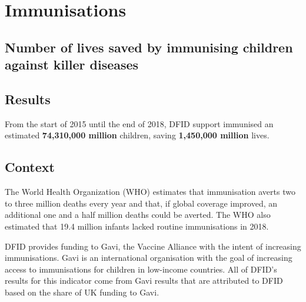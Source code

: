 \chapter{Immunisations}

\section*{Number of lives saved by immunising children against killer diseases}


\thispagestyle{empty}



\section{Results}
From the start of 2015 until the end of 2018, DFID support immunised an estimated \textbf{
74,310,000
million} children, saving \textbf{
1,450,000
million} lives. %



\section{Context}

The World Health Organization (WHO) estimates that immunisation averts two to three million deaths every year and that, if global coverage improved, an additional one and a half million deaths could be averted. %
The WHO also estimated that 19.4 million infants lacked routine immunisations in 2018\footnotemark. \\%


DFID provides funding to Gavi, the Vaccine Alliance with the intent of increasing immunisations. %
Gavi is an international organisation with the goal of increasing access to immunisations for children in low-income countries. %
All of DFID's results for this indicator come from Gavi results that are attributed to DFID based on the share of UK funding to Gavi. %

\newpage
